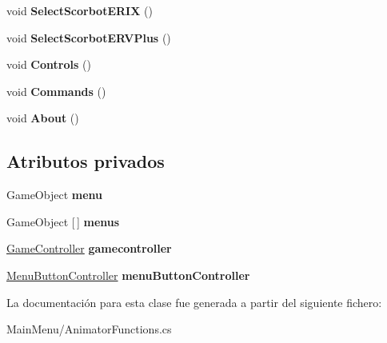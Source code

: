\begin{DoxyCompactItemize}
\item 
\mbox{\label{class_animator_functions_ae71b52412fec20a452c8a617a12614c6}} 
void {\bfseries Select\+Scorbot\+E\+R\+IX} ()
\item 
\mbox{\label{class_animator_functions_af181d9e0d15c90193fda9e8766fb820c}} 
void {\bfseries Select\+Scorbot\+E\+R\+V\+Plus} ()
\item 
\mbox{\label{class_animator_functions_ab5fb7988a9df7571a4a74907a3b29ea5}} 
void {\bfseries Controls} ()
\item 
\mbox{\label{class_animator_functions_a6dba7a70ee964424e91c9817d2edaecc}} 
void {\bfseries Commands} ()
\item 
\mbox{\label{class_animator_functions_a35a71ab86b80ff3826b04f1457e8b573}} 
void {\bfseries About} ()
\end{DoxyCompactItemize}
\subsection*{Atributos privados}
\begin{DoxyCompactItemize}
\item 
\mbox{\label{class_animator_functions_a162a21e1e1ea0b4dd25a93c98dc40b6d}} 
Game\+Object {\bfseries menu}
\item 
\mbox{\label{class_animator_functions_a775e25cebdeddf24c70df9cdff18d4e0}} 
Game\+Object \mbox{[}$\,$\mbox{]} {\bfseries menus}
\item 
\mbox{\label{class_animator_functions_a5312bb5dd4ccdf464994386a5456c6ba}} 
\mbox{\hyperlink{class_game_controller}{Game\+Controller}} {\bfseries gamecontroller}
\item 
\mbox{\label{class_animator_functions_a139b8fa3d653ca778f53b25371c4557b}} 
\mbox{\hyperlink{class_menu_button_controller}{Menu\+Button\+Controller}} {\bfseries menu\+Button\+Controller}
\end{DoxyCompactItemize}


La documentación para esta clase fue generada a partir del siguiente fichero\+:\begin{DoxyCompactItemize}
\item 
Main\+Menu/Animator\+Functions.\+cs\end{DoxyCompactItemize}
